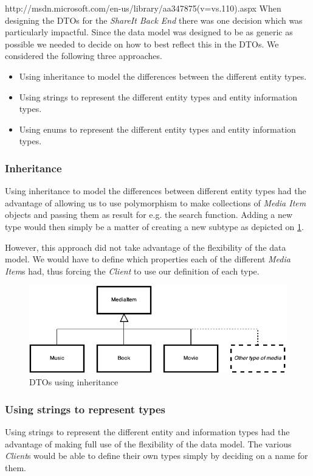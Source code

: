 \documentclass[../report.tex]{subfiles}
\begin{document}
http://msdn.microsoft.com/en-us/library/aa347875(v=vs.110).aspx
When designing the DTOs for the \textit{ShareIt Back End} there was one decision which was particularly impactful. Since the data model was designed to be as generic as possible we needed to decide on how to best reflect this in the DTOs. We considered the following three approaches.
\begin{itemize}
\item Using inheritance to model the differences between the different entity types.
\item Using strings to represent the different entity types and entity information types.
\item Using enums to represent the different entity types and entity information types.
\end{itemize}

\subsubsection{Inheritance}
Using inheritance to model the differences between different entity types had the advantage of allowing us to use polymorphism to make collections of \textit{Media Item} objects and passing them as result for e.g. the search function. Adding a new type would then simply be a matter of creating a new subtype as depicted on \ref{fig:dto_inheritance}.
 
However, this approach did not take advantage of the flexibility of the data model. We would have to define which properties each of the different \textit{Media Item}s had, thus forcing the \textit{Client} to use our definition of each type.

\begin{figure}[!h]
\label{fig:dto_inheritance}
\centering
\includegraphics[scale=0.7]{../img/DTOInheritance.pdf}
\caption{DTOs using inheritance}
\end{figure}

\subsubsection{Using strings to represent types}
Using strings to represent the different entity and information types had the advantage of making full use of the flexibility of the data model. The various \textit{Client}s would be able to define their own types simply by deciding on a name for them. 
\end{document}
